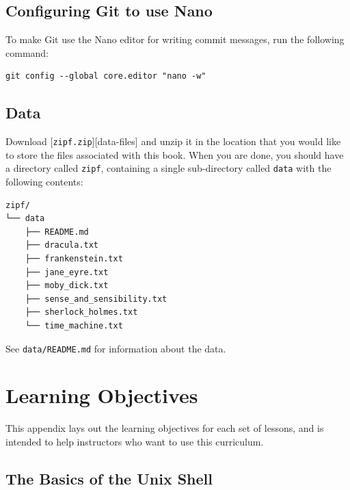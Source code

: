 \documentclass[
]{krantz}
\begin{document}
\hypertarget{install-git-nano}{%
\section{Configuring Git to use Nano}\label{install-git-nano}}

To make Git use the Nano editor for writing commit messages,
run the following command:

\begin{verbatim}
git config --global core.editor "nano -w"
\end{verbatim}

\hypertarget{install-data}{%
\section{Data}\label{install-data}}

Download {[}\texttt{zipf.zip}{]}{[}data-files{]} and unzip it in the location that you would like
to store the files associated with this book.
When you are done,
you should have a directory called \texttt{zipf},
containing a single sub-directory called \texttt{data}
with the following contents:

\begin{verbatim}
zipf/
└── data
    ├── README.md
    ├── dracula.txt
    ├── frankenstein.txt
    ├── jane_eyre.txt
    ├── moby_dick.txt
    ├── sense_and_sensibility.txt
    ├── sherlock_holmes.txt
    └── time_machine.txt
\end{verbatim}

See \texttt{data/README.md} for information about the data.

\hypertarget{objectives}{%
\chapter{Learning Objectives}\label{objectives}}

This appendix lays out the learning objectives for each set of lessons,
and is intended to help instructors who want to use this curriculum.

\hypertarget{the-basics-of-the-unix-shell}{%
\section{The Basics of the Unix Shell}\label{the-basics-of-the-unix-shell}}
\end{document}
